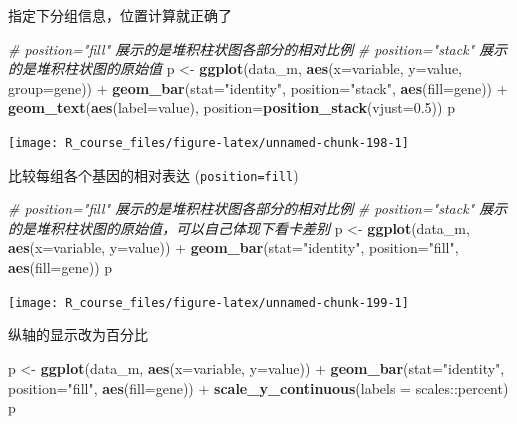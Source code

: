 \documentclass[]{article}
\newenvironment{Shaded}{\begin{snugshade}}{\end{snugshade}}
\newcommand{\KeywordTok}[1]{\textcolor[rgb]{0.13,0.29,0.53}{\textbf{{#1}}}}
\newcommand{\DataTypeTok}[1]{\textcolor[rgb]{0.13,0.29,0.53}{{#1}}}
\newcommand{\FloatTok}[1]{\textcolor[rgb]{0.00,0.00,0.81}{{#1}}}
\newcommand{\StringTok}[1]{\textcolor[rgb]{0.31,0.60,0.02}{{#1}}}
\newcommand{\CommentTok}[1]{\textcolor[rgb]{0.56,0.35,0.01}{\textit{{#1}}}}
\newcommand{\NormalTok}[1]{{#1}}
\numberwithin{figure}{section}
\numberwithin{table}{section}
\theoremstyle{definition}
\theoremstyle{definition}
\theoremstyle{definition}
\theoremstyle{remark}
\begin{document}
指定下分组信息，位置计算就正确了

\begin{Shaded}
\begin{Highlighting}[]
\CommentTok{# position="fill" 展示的是堆积柱状图各部分的相对比例}
\CommentTok{# position="stack" 展示的是堆积柱状图的原始值}
\NormalTok{p <-}\StringTok{ }\KeywordTok{ggplot}\NormalTok{(data_m, }\KeywordTok{aes}\NormalTok{(}\DataTypeTok{x=}\NormalTok{variable, }\DataTypeTok{y=}\NormalTok{value, }\DataTypeTok{group=}\NormalTok{gene)) +}
\StringTok{    }\KeywordTok{geom_bar}\NormalTok{(}\DataTypeTok{stat=}\StringTok{"identity"}\NormalTok{, }\DataTypeTok{position=}\StringTok{"stack"}\NormalTok{, }\KeywordTok{aes}\NormalTok{(}\DataTypeTok{fill=}\NormalTok{gene)) +}
\StringTok{    }\KeywordTok{geom_text}\NormalTok{(}\KeywordTok{aes}\NormalTok{(}\DataTypeTok{label=}\NormalTok{value), }\DataTypeTok{position=}\KeywordTok{position_stack}\NormalTok{(}\DataTypeTok{vjust=}\FloatTok{0.5}\NormalTok{))}
\NormalTok{p}
\end{Highlighting}
\end{Shaded}

\begin{center}\texttt{[image: R\_course\_files/figure-latex/unnamed-chunk-198-1]} \end{center}

比较每组各个基因的相对表达 (\texttt{position=fill})

\begin{Shaded}
\begin{Highlighting}[]
\CommentTok{# position="fill" 展示的是堆积柱状图各部分的相对比例}
\CommentTok{# position="stack" 展示的是堆积柱状图的原始值，可以自己体现下看卡差别}
\NormalTok{p <-}\StringTok{ }\KeywordTok{ggplot}\NormalTok{(data_m, }\KeywordTok{aes}\NormalTok{(}\DataTypeTok{x=}\NormalTok{variable, }\DataTypeTok{y=}\NormalTok{value)) +}
\StringTok{    }\KeywordTok{geom_bar}\NormalTok{(}\DataTypeTok{stat=}\StringTok{"identity"}\NormalTok{, }\DataTypeTok{position=}\StringTok{"fill"}\NormalTok{, }\KeywordTok{aes}\NormalTok{(}\DataTypeTok{fill=}\NormalTok{gene))}
\NormalTok{p}
\end{Highlighting}
\end{Shaded}

\begin{center}\texttt{[image: R\_course\_files/figure-latex/unnamed-chunk-199-1]} \end{center}

纵轴的显示改为百分比

\begin{Shaded}
\begin{Highlighting}[]
\NormalTok{p <-}\StringTok{ }\KeywordTok{ggplot}\NormalTok{(data_m, }\KeywordTok{aes}\NormalTok{(}\DataTypeTok{x=}\NormalTok{variable, }\DataTypeTok{y=}\NormalTok{value)) +}
\StringTok{    }\KeywordTok{geom_bar}\NormalTok{(}\DataTypeTok{stat=}\StringTok{"identity"}\NormalTok{, }\DataTypeTok{position=}\StringTok{"fill"}\NormalTok{, }\KeywordTok{aes}\NormalTok{(}\DataTypeTok{fill=}\NormalTok{gene)) +}
\StringTok{    }\KeywordTok{scale_y_continuous}\NormalTok{(}\DataTypeTok{labels =} \NormalTok{scales::percent)}
\NormalTok{p}
\end{Highlighting}
\end{Shaded}
\end{document}
